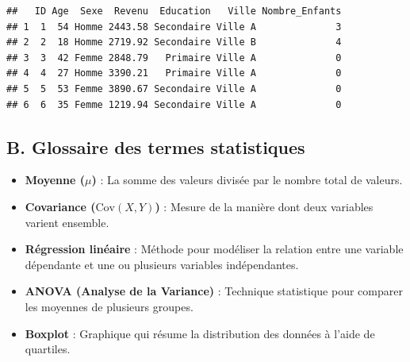 \documentclass[
]{article}
\providecommand{\tightlist}{%
  \setlength{\itemsep}{0pt}\setlength{\parskip}{0pt}}
\begin{document}
\begin{verbatim}
##   ID Age  Sexe  Revenu  Education   Ville Nombre_Enfants
## 1  1  54 Homme 2443.58 Secondaire Ville A              3
## 2  2  18 Homme 2719.92 Secondaire Ville B              4
## 3  3  42 Femme 2848.79   Primaire Ville A              0
## 4  4  27 Homme 3390.21   Primaire Ville A              0
## 5  5  53 Femme 3890.67 Secondaire Ville A              0
## 6  6  35 Femme 1219.94 Secondaire Ville A              0
\end{verbatim}

\hypertarget{b.-glossaire-des-termes-statistiques}{%
\subsection{B. Glossaire des termes
statistiques}\label{b.-glossaire-des-termes-statistiques}}

\begin{itemize}
\tightlist
\item
  \textbf{Moyenne (\(\mu\))} : La somme des valeurs divisée par le
  nombre total de valeurs.
\item
  \textbf{Covariance (\(\text{Cov}(X, Y)\))} : Mesure de la manière dont
  deux variables varient ensemble.
\item
  \textbf{Régression linéaire} : Méthode pour modéliser la relation
  entre une variable dépendante et une ou plusieurs variables
  indépendantes.
\item
  \textbf{ANOVA (Analyse de la Variance)} : Technique statistique pour
  comparer les moyennes de plusieurs groupes.
\item
  \textbf{Boxplot} : Graphique qui résume la distribution des données à
  l'aide de quartiles.
\end{itemize}
\end{document}
